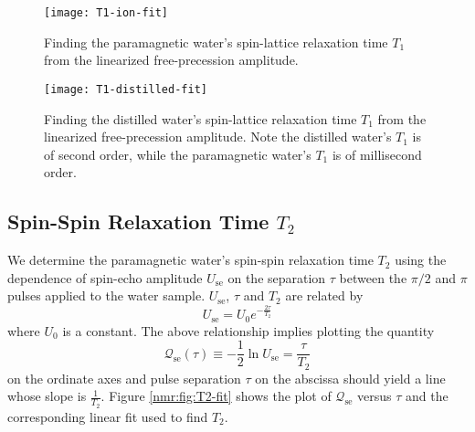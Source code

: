 \documentclass[11pt, a4paper]{article}
\begin{document}
\begin{figure}
\centering
\texttt{[image: T1-ion-fit]}
\caption{Finding the paramagnetic water's spin-lattice relaxation time $ T_{1} $ from the linearized free-precession amplitude.}
\label{nmr:fig:T1-ion-fit}
\end{figure}



\begin{figure}
\centering
\texttt{[image: T1-distilled-fit]}
\caption{Finding the distilled water's spin-lattice relaxation time $ T_{1} $ from the linearized free-precession amplitude. Note the distilled water's $ T_{1} $ is of second order, while the paramagnetic water's $ T_{1} $ is of millisecond order.}
\label{nmr:fig:T1-distilled-fit}
\end{figure}



\subsection{Spin-Spin Relaxation Time $ T_{2} $}
We determine the paramagnetic water's spin-spin relaxation time $ T_{2} $ using the dependence of spin-echo amplitude $ U_{\text{se}} $ on the separation $ \tau $ between the $ \pi/2 $ and $ \pi $ pulses applied to the water sample. $ U_{\text{se}} $, $ \tau $ and $ T_{2} $ are related by
\begin{equation*}
	U_{\text{se}} = U_{0}e^{-\frac{2\tau}{T_{2}}}
\end{equation*}
where $ U_{0} $ is a constant. The above relationship implies plotting the quantity
\begin{equation*}
	\mathcal{Q}_{\text{se}}(\tau) \equiv -\frac{1}{2}\ln U_{\text{se}} = \frac{\tau}{T_{2}}
\end{equation*}
on the ordinate axes and pulse separation $ \tau $ on the abscissa should yield a line whose slope is $ \frac{1}{T_{2}} $. Figure \ref{nmr:fig:T2-fit} shows the plot of $ \mathcal{Q}_{\text{se}} $ versus $ \tau $ and the corresponding linear fit used to find $ T_{2} $.
\end{document}

